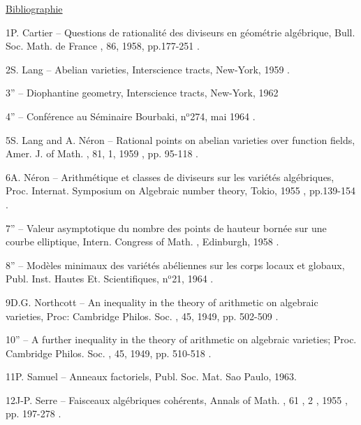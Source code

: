 \begin{center}\uline{Bibliographie}\end{center}

\handwritten{[}1\handwritten{]}\quad P. Cartier -- Questions de rationalité des diviseurs en géométrie algébrique, Bull. Soc. Math. de France , 86, 1958, pp.177-251 .

\handwritten{[}2\handwritten{]}\quad S. Lang -- Abelian varieties, Interscience tracts, New-York,  1959 .

\handwritten{[}3\handwritten{]}\quad '' -- Diophantine geometry, Interscience tracts, New-York, 1962

\handwritten{[}4\handwritten{]}\quad '' -- Conférence au Séminaire Bourbaki, n$^{\mathrm o}$274, mai 1964 .

\handwritten{[}5\handwritten{]}\quad S. Lang and A. Néron -- Rational points on abelian varieties over function fields, Amer. J. of Math. , 81, 1, 1959 , pp. 95-118 .

\handwritten{[}6\handwritten{]}\quad A. Néron -- Arithmétique et classes de diviseurs sur les variétés algébriques, Proc. Internat. Symposium on Algebraic number theory, Tokio, 1955 , pp.139-154 .

\handwritten{[}7\handwritten{]}\quad '' -- Valeur asymptotique du nombre des points de hauteur bornée sur une courbe elliptique, Intern. Congress of Math. , Edinburgh, 1958 .

\handwritten{[}8\handwritten{]}\quad '' -- Modèles minimaux des variétés abéliennes sur les corps locaux et globaux, Publ. Inst. Hautes Et. Scientifiques, n$^{\mathrm o}$21, 1964 .

\handwritten{[}9\handwritten{]}\quad D.G. Northcott -- An inequality in the theory of arithmetic on algebraic varieties, Proc: Cambridge Philos. Soc. , 45, 1949, pp. 502-509 .

\handwritten{[}10\handwritten{]}\quad '' -- A further inequality in the theory of arithmetic on algebraic varieties; Proc. Cambridge Philos. Soc. , 45, 1949, pp. 510-518 .

\handwritten{[}11\handwritten{]}\quad P. Samuel -- Anneaux factoriels, Publ. Soc. Mat. Sao Paulo, 1963.

\handwritten{[}12\handwritten{]}\quad J-P. Serre -- Faisceaux algébriques cohérents, Annals of Math. , 61 , 2 , 1955 , pp. 197-278 .
